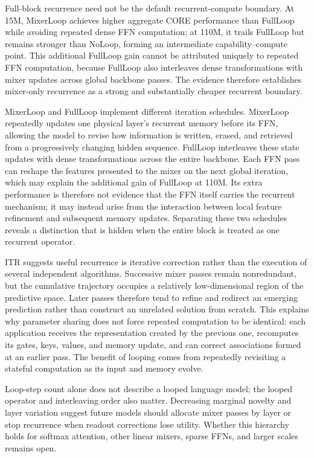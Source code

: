 \documentclass[letterpaper]{article} %
\begin{document}
Full-block recurrence need not be the default recurrent-compute boundary. At
15M, MixerLoop achieves higher aggregate CORE performance than FullLoop while
avoiding repeated dense FFN computation; at 110M, it trails FullLoop but remains
stronger than NoLoop, forming an intermediate capability--compute point. This
additional FullLoop gain cannot be attributed uniquely to repeated FFN
computation, because FullLoop also interleaves dense transformations with mixer
updates across global backbone passes. The evidence therefore establishes
mixer-only recurrence as a strong and substantially cheaper recurrent boundary.

MixerLoop and FullLoop implement different iteration schedules. MixerLoop
repeatedly updates one physical layer's recurrent memory before its FFN,
allowing the model to revise how information is written, erased, and retrieved
from a progressively changing hidden sequence. FullLoop interleaves these state
updates with dense transformations across the entire backbone. Each FFN pass can
reshape the features presented to the mixer on the next global iteration, which
may explain the additional gain of FullLoop at 110M. Its extra performance is
therefore not evidence that the FFN itself carries the recurrent mechanism; it
may instead arise from the interaction between local feature refinement and
subsequent memory updates. Separating these two schedules reveals a distinction
that is hidden when the entire block is treated as one recurrent operator.

ITR suggests useful recurrence is iterative correction rather than the execution
of several independent algorithms. Successive mixer passes remain
nonredundant, but the cumulative trajectory occupies a relatively
low-dimensional region of the predictive space. Later passes therefore tend to
refine and redirect an emerging prediction rather than construct an unrelated
solution from scratch. This explains why parameter sharing does not force
repeated computation to be identical: each application receives the
representation created by the previous one, recomputes its gates, keys, values,
and memory update, and can correct associations formed at an earlier pass. The
benefit of looping comes from repeatedly revisiting a stateful computation as
its input and memory evolve.

Loop-step count alone does not describe a looped language model; the looped
operator and interleaving order also matter. Decreasing marginal novelty and
layer variation suggest future models should allocate mixer passes by layer or
stop recurrence when readout corrections lose utility. Whether this hierarchy
holds for softmax attention, other linear mixers, sparse FFNs, and larger scales
remains open.
\end{document}
